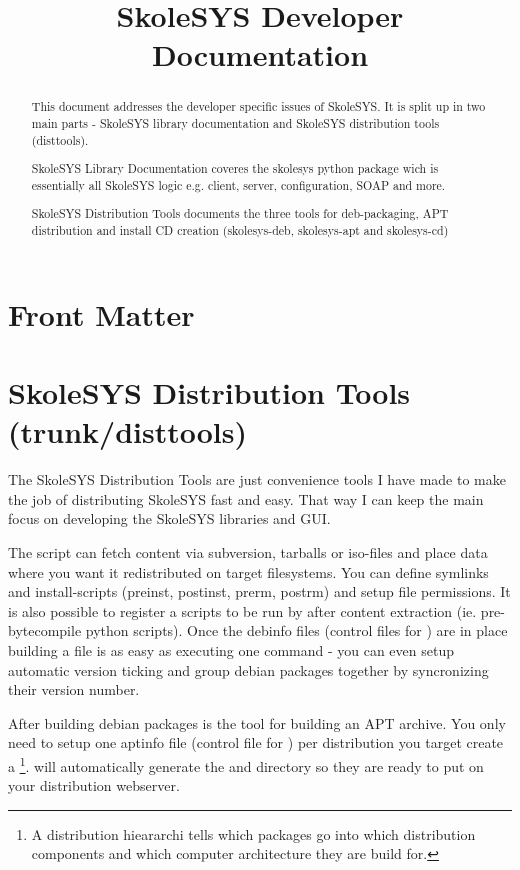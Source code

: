 \documentclass{manual}
\title{SkoleSYS Developer Documentation}
\begin{document}
\maketitle

\ifhtml
\chapter*{Front Matter\label{front}}
\fi

\begin{abstract}

\noindent
This document addresses the developer specific issues of SkoleSYS. It is
split up in two main parts - SkoleSYS library documentation and SkoleSYS
distribution tools (disttools).

SkoleSYS Library Documentation coveres the skolesys python package wich
is essentially all SkoleSYS logic e.g. client, server, configuration, SOAP
and more.

SkoleSYS Distribution Tools documents the three tools for deb-packaging,
APT distribution and install CD creation (skolesys-deb, skolesys-apt and 
skolesys-cd)

\end{abstract}

\tableofcontents

\chapter{SkoleSYS Distribution Tools (trunk/disttools)\label{disttools}}
The SkoleSYS Distribution Tools are just convenience tools I have made to make the job of distributing SkoleSYS fast and easy. That way I can keep the main focus on developing the SkoleSYS libraries and GUI. 

The  script can fetch content via subversion, tarballs or iso-files and place data where you want it redistributed on target filesystems. You can define symlinks and install-scripts (preinst, postinst, prerm, postrm) and setup file permissions. It is also possible to register a scripts to be run by  after content extraction (ie. pre-bytecompile python scripts). Once the debinfo files (control files for ) are in place building a file is as easy as executing one command - you can even setup automatic version ticking and group debian packages together by syncronizing their version number.

After building debian packages  is the tool for building an APT archive. You only need to setup one aptinfo file (control file for ) per distribution you target create a \footnote{A distribution hieararchi tells  which packages go into which distribution components and which computer architecture they are build for.}.  will automatically generate the  and  directory so they are ready to put on your distribution webserver.


%
\end{document}
